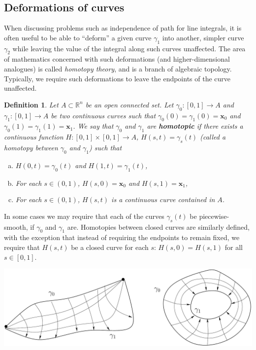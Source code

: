 \documentclass[12pt,letterpaper]{article}
\newtheorem{definition}[theorem]{Definition}
\newcommand{\R}{\mathbb{R}}
\newcommand{\x}{\mathbf{x}}
\begin{document}
\subsection{Deformations of curves}
When discussing problems such as independence of path for line integrals, it is often useful to be able to ``deform'' a given curve $\gamma_1$ into another, simpler curve $\gamma_2$ while leaving the value of the integral along such curves unaffected.  The area of mathematics concerned with such deformations (and higher-dimensional analogues) is called {\em homotopy theory}, and is a branch of algebraic topology.  Typically, we require such deformations to leave the endpoints of the curve unaffected.
\begin{definition}
Let $A\subset \R^n$ be an open connected set. Let $\gamma_0:[0,1]\to A$ and $\gamma_1: [0,1]\to A$ be two continuous curves such that $\gamma_0(0)=\gamma_1(0)=\x_0$ and $\gamma_0(1)=\gamma_1(1)=\x_1$.  We say that $\gamma_0$ and $\gamma_1$ are {\bf homotopic} if there exists a continuous function $H:[0,1]\times [0,1]\to A$, $H(s,t) = \gamma_s(t)$ (called a homotopy between $\gamma_0$ and $\gamma_1$) such that
\begin{enumerate}[(a)]
\item $H(0,t) = \gamma_0(t)$ and $H(1,t) = \gamma_1(t)$,
\item For each $s\in (0,1)$, $H(s,0) = \x_0$ and $H(s,1)=\x_1$,
\item For each $s\in (0,1)$, $H(s,t)$ is a continuous curve contained in $A$.
\end{enumerate}
\end{definition}
In some cases we may require that each of the curves $\gamma_s(t)$ be piecewise-smooth, if $\gamma_0$ and $\gamma_1$ are.  
Homotopies between closed curves are similarly defined, with the exception that instead of requiring the endpoints to remain fixed, we require that $H(s,t)$ be a closed curve for each $s$: $H(s,0)=H(s,1)$ for all $s\in [0,1]$.  
\begin{center}
\includegraphics[width=6in]{homotopy.pdf}
\end{center}
\end{document}
